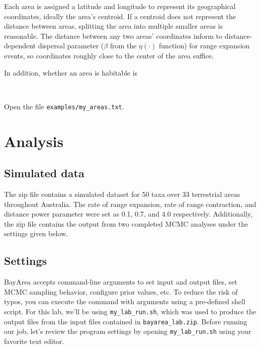\documentclass[11pt]{article}
\newcommand{\impmark}{\strut\vadjust{\domark}}
\newcommand{\domark}{%
  \vbox to 0pt{
    \kern-\dp\strutbox
    \smash{\llap{$\rightarrow$\kern1em}}
    \vss
  }%
}
\begin{document}
Each area is assigned a latitude and longitude to represent its geographical coordinates, ideally the area's centroid.
If a centroid does not represent the distance between areas, splitting the area into multiple smaller areas is reasonable.
The distance between any two areas' coordinates inform to distance-dependent dispersal parameter ($\beta$ from the $\eta(\cdot)$ function) for range expansion events, so coordinates roughly close to the center of the area suffice.

In addition, whether an area is habitable is 

\noindent \\ \impmark Open the file \texttt{examples/my\_areas.txt}.



\section{Analysis}

\subsection{Simulated data}

The zip file contains a simulated dataset for 50 taxa over 33 terrestrial areas throughout Australia.
The rate of range expansion, rate of range contraction, and distance power parameter were set as 0.1, 0.7, and 4.0 respectively.
Additionally, the zip file contains the output from two completed MCMC analyses under the settings given below.

\subsection{Settings}

BayArea accepts command-line arguments to set input and output files, set MCMC sampling behavior, configure prior values, etc.
To reduce the risk of typos, you can execute the command with arguments using a pre-defined shell script.
For this lab, we'll be using \texttt{my\_lab\_run.sh}, which was used to produce the output files from the input files contained in \texttt{bayarea\_lab.zip}.
Before running our job, let's review the program settings by opening \texttt{my\_lab\_run.sh} using your favorite text editor.
\end{document}
